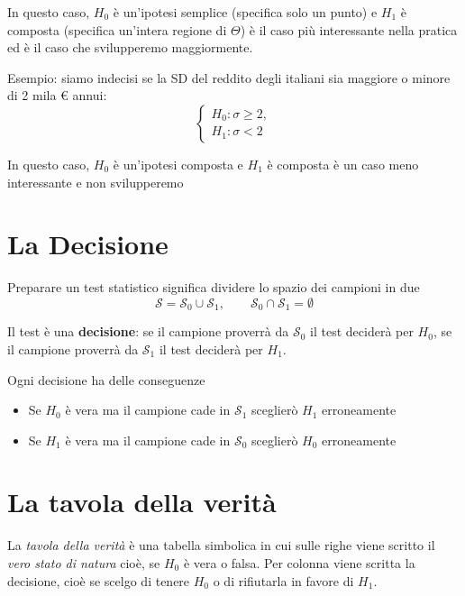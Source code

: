 \documentclass[
  11pt,
]{book}
\providecommand{\tightlist}{%
  \setlength{\itemsep}{0pt}\setlength{\parskip}{0pt}}
\theoremstyle{mytheoremstyle}
\theoremstyle{mydefstyle}
\begin{document}
In questo caso, \(H_0\) è un'ipotesi semplice (specifica solo un punto) e \(H_1\) è composta
(specifica un'intera regione di \(\Theta\)) è il caso più interessante nella pratica
ed è il caso che svilupperemo maggiormente.

Esempio: siamo indecisi se la SD del reddito degli italiani sia maggiore o minore di 2 mila € annui:
\[\begin{cases}
H_0:\sigma\geq 2, \\
H_1:\sigma<2
\end{cases}
\]

In questo caso, \(H_0\) è un'ipotesi composta e \(H_1\) è composta è un caso meno interessante
e non svilupperemo

\section{La Decisione}\label{la-decisione}

Preparare un test statistico significa dividere lo spazio dei campioni in due
\[\mathcal{S}=\mathcal{S}_0\cup\mathcal{S}_1,\qquad \mathcal{S}_0\cap\mathcal{S}_1=\emptyset
\]

Il test è una \textbf{decisione}: se il campione proverrà da \(\mathcal{S}_0\) il test deciderà per \(H_0\), se il campione proverrà da \(\mathcal{S}_1\) il test deciderà per \(H_1\).

Ogni decisione ha delle conseguenze

\begin{itemize}
\tightlist
\item
  Se \(H_0\) è vera ma il campione cade in \(\mathcal{S}_1\) sceglierò \(H_1\) erroneamente
\item
  Se \(H_1\) è vera ma il campione cade in \(\mathcal{S}_0\) sceglierò \(H_0\) erroneamente
\end{itemize}

\section{La tavola della verità}\label{la-tavola-della-verituxe0}

La \emph{tavola della verità} è una tabella simbolica in cui sulle righe viene scritto il \emph{vero stato di natura} cioè, se \(H_0\) è vera o falsa. Per colonna viene scritta la decisione, cioè
se scelgo di tenere \(H_0\) o di rifiutarla in favore di \(H_1\).
\end{document}

